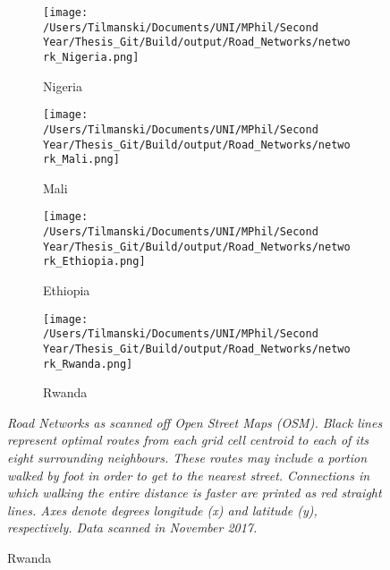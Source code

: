 \documentclass[11pt, oneside]{article}   	%
\newcommand{\mysubcaption}[1]{
\justify
\begin{spacing}{0.7}
\textit{\footnotesize #1}
\end{spacing}}
\begin{document}
\begin{figure}[t]
\centering
\caption{Road Networks for different countries as scraped off OSM}

\begin{subfigure}[c]{0.43\textwidth}
\texttt{[image: /Users/Tilmanski/Documents/UNI/MPhil/Second Year/Thesis\_Git/Build/output/Road\_Networks/network\_Nigeria.png]}
\caption{Nigeria}
\label{fig:nigeria_roads}
\end{subfigure}
\begin{subfigure}[c]{0.43\textwidth}
\texttt{[image: /Users/Tilmanski/Documents/UNI/MPhil/Second Year/Thesis\_Git/Build/output/Road\_Networks/network\_Mali.png]}
\caption{Mali}
\label{fig:Mali_roads}
\end{subfigure}

\begin{subfigure}[c]{0.43\textwidth}
\texttt{[image: /Users/Tilmanski/Documents/UNI/MPhil/Second Year/Thesis\_Git/Build/output/Road\_Networks/network\_Ethiopia.png]}
\caption{Ethiopia}
\label{fig:Ethiopia_roads}
\end{subfigure}
\begin{subfigure}[c]{0.43\textwidth}
\texttt{[image: /Users/Tilmanski/Documents/UNI/MPhil/Second Year/Thesis\_Git/Build/output/Road\_Networks/network\_Rwanda.png]}
\caption{Rwanda}
\label{fig:Rwanda_roads}
\end{subfigure}
\mysubcaption{Road Networks as scanned off Open Street Maps (OSM). Black lines represent optimal routes from each grid cell centroid to each of its eight surrounding neighbours. These routes may include a portion walked by foot in order to get to the nearest street. Connections in which walking the entire distance is faster are printed as red straight lines. Axes denote degrees longitude (x) and latitude (y), respectively. Data scanned in November 2017.}

\label{fig:roads}
\end{figure}
\end{document}
